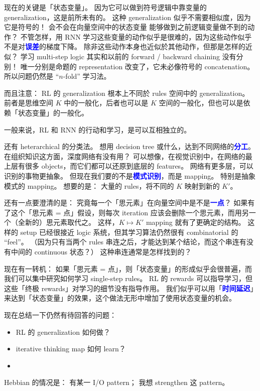 \documentclass[orivec]{llncs}
\newcommand{\emp}[1]{\textbf{\textcolor{blue}{#1}}}
\begin{document}
现在的关键是「状态变量」。  因为它可以做到符号逻辑中靠变量的 generalization，这是前所未有的。  这种 generalization 似乎不需要相似度，因为它是符号的！  会不会在向量空间中的状态变量 能够做到之前逻辑变量做不到的动作？  不管怎样，用 RNN 学习这些变量的动作似乎是很难的，因为这些动作似乎不是对\emp{误差}的梯度下降。  除非这些动作本身也近似於其他动作，但那是怎样的近似？  学习 multi-step logic 其实和以前的 forward / backward chaining 没有分别！  唯一分别是命题的 representation 改变了，它未必像符号的 concatenation。  所以问题仍然是 ``$n$-fold'' 学习法。 

而且注意： RL 的 generalization 根本上不同於 rules 空间中的 generalization。 前者是思维空间 $K$ 中的一般化，后者也可以是 $K$ 空间的一般化，但也可以是依赖「状态变量」的一般化。

一般来说，RL 和 RNN 的行动和学习，是可以互相独立的。  

还有 heterarchical 的分类法。  想用 decision tree 或什么，达到不同网络的\emp{分工}。  在组织知识这方面，深度网络有没有用？  可以想像，在视觉识别中，在网络的最上层有很多 objects，而它们都可以还原到底层的 features。  网络有更多层，可以识别的事物更抽象。  但现在我们要的不是\emp{模式识别}，而是 mapping。 特别是抽象模式的 mapping。  想要的是： 大量的 rules，将不同的 $K$ 映射到新的 $K'$。

还有一点要澄清的是： 究竟每一个「思元素」在向量空间中是不是\emp{一点}？  如果有了这个「思元素 = 点」假设，则每次 iteration 应该会删除一个思元素，而用另一个（全新的）思元素取代之。  这样，$K \mapsto K'$ mapping 就有了更确定的结构。  这样的 setup 已经很接近 logic 系统，但其学习算法仍然很有 combinatorial 的 ``feel''。 （因为只有当两个 rules 串连之后，才能达到某个结论，而这个串连有没有中间的 continuous 状态？）  这种串连通常是怎样找到的？  

现在有一转机： 如果「思元素 = 点」，则「状态变量」的形成似乎会很普遍，而我们可以集中研究如何学习 single-step rules。 RL 的 rewards 可以指导学习，但这些「终极 rewards」对学习的细节没有指导作用。  我们似乎可以用「\emp{时间延迟}」来达到「状态变量」的效果，这个做法无形中增加了使用状态变量的机会。  

现在总结一下仍然有待回答的问题：
\begin{itemize}
\item RL 的 generalization 如何做？
\item iterative thinking map 如何 learn？
\item 
\end{itemize}

Hebbian 的情况是： 有某一 I/O pattern； 我想 strengthen 这 pattern。 
\end{document}
